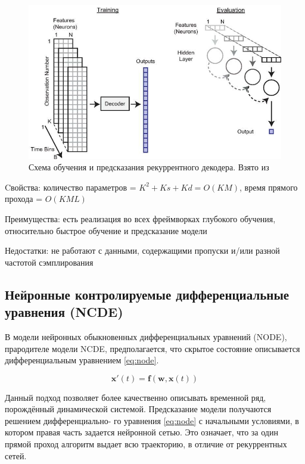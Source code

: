 \documentclass[a4paper, 12pt]{article}
\newcommand{\bx}{\mathbf{x}}
\newcommand{\bw}{\mathbf{w}}
\newcommand{\bff}{\mathbf{f}}
\begin{document}
	\begin{figure}[bhtp]
		\includegraphics[width=\textwidth]{rnn-schema.jpg}
		\caption{Схема обучения и предсказания рекуррентного декодера. Взято из \citep{glaser2020machine}}
		\label{fig:rnn-schema}
	\end{figure}

	Cвойства: количество параметров = $K^2 + Ks + Kd = O(KM)$, время прямого прохода = $O(KML)$

	Преимущества: есть реализация во всех фреймворках глубокого обучения, относительно быстрое обучение и предсказание модели

	Недостатки: не работают с данными, содержащими пропуски и/или разной частотой сэмплирования

	\subsection{Нейронные контролируемые дифференциальные уравнения (NCDE)}
	В модели нейронных обыкновенных дифференциальных уравнений (NODE), прародителе модели NCDE, предполагается, что скрытое состояние описывается дифференциальным уравнением \ref{eq:node}.
	
	\begin{equation}\label{eq:node}
		\bx'(t) = \bff(\bw, \bx(t))
	\end{equation}

	Данный подход позволяет более качественно описывать временной ряд, порождённый динамической системой. Предсказание модели получаются решением дифференциально-
	го уравнения \ref{eq:node} с начальными условиями, в котором правая часть задается нейронной сетью. Это означает, что за один прямой проход алгоритм выдает всю траекторию, в отличие от рекуррентных сетей.
	
\end{document}
